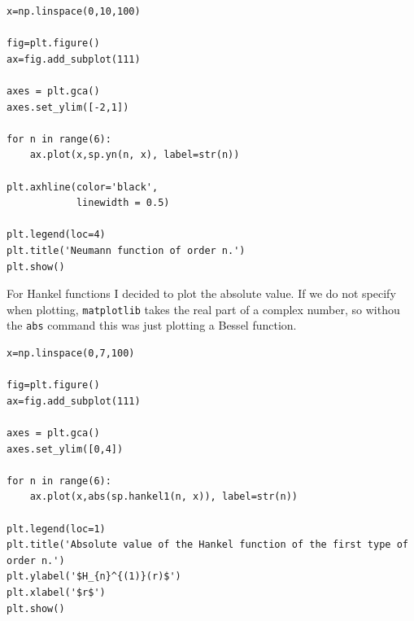 %
\begin{lstlisting}[caption={Plot of neumann functions of integer order},label={lst:neumann_int_no}]
x=np.linspace(0,10,100)

fig=plt.figure()
ax=fig.add_subplot(111)

axes = plt.gca()
axes.set_ylim([-2,1])

for n in range(6):
    ax.plot(x,sp.yn(n, x), label=str(n))

plt.axhline(color='black',
            linewidth = 0.5)

plt.legend(loc=4)
plt.title('Neumann function of order n.')
plt.show()\end{lstlisting}\par
%
For Hankel functions I decided to plot the absolute value. If we do not specify when plotting, \verb!matplotlib! takes the real part of a complex number, so withou the \verb!abs! command this was just plotting a Bessel function.
%
\begin{lstlisting}[caption={Plot of hankel functions of integer order},label={lst:hankel_int_no}]
x=np.linspace(0,7,100)

fig=plt.figure()
ax=fig.add_subplot(111)

axes = plt.gca()
axes.set_ylim([0,4])

for n in range(6):
    ax.plot(x,abs(sp.hankel1(n, x)), label=str(n))

plt.legend(loc=1)
plt.title('Absolute value of the Hankel function of the first type of order n.')
plt.ylabel('$H_{n}^{(1)}(r)$')
plt.xlabel('$r$')
plt.show()\end{lstlisting}\par
